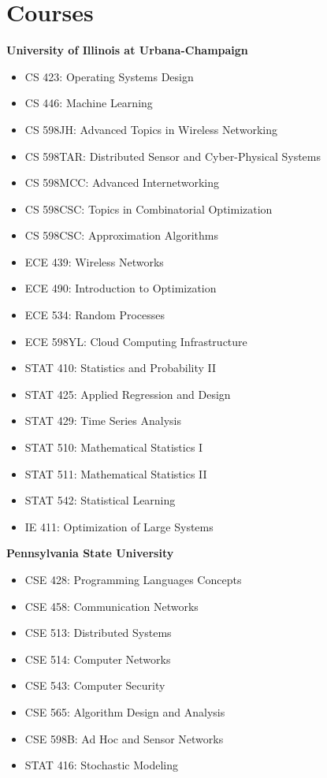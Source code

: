 \section{\sc Courses}
{\bf University of Illinois at Urbana-Champaign}\\

\begin{itemize}
\item
CS 423: Operating Systems Design
\item
CS 446: Machine Learning
\item
CS 598JH: Advanced Topics in Wireless Networking
\item
CS 598TAR: Distributed Sensor and Cyber-Physical Systems
\item
CS 598MCC: Advanced Internetworking
\item
CS 598CSC: Topics in Combinatorial Optimization
\item
CS 598CSC: Approximation Algorithms
\item
ECE 439: Wireless Networks
\item
ECE 490: Introduction to Optimization
\item
ECE 534: Random Processes
\item
ECE 598YL: Cloud Computing Infrastructure
\item
STAT 410: Statistics and Probability II
\item
STAT 425: Applied Regression and Design
\item
STAT 429: Time Series Analysis
\item
STAT 510: Mathematical Statistics I
\item
STAT 511: Mathematical Statistics II
\item
STAT 542: Statistical Learning
\item
IE 411: Optimization of Large Systems
\end{itemize}



{\bf Pennsylvania State University}\\

\begin{itemize}
\item
CSE 428: Programming Languages Concepts
\item
CSE 458: Communication Networks
\item
CSE 513: Distributed Systems
\item
CSE 514: Computer Networks
\item
CSE 543: Computer Security
\item
CSE 565: Algorithm Design and Analysis
\item
CSE 598B: Ad Hoc and Sensor Networks
\item
STAT 416: Stochastic Modeling
\end{itemize}
